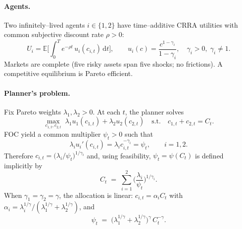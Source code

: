 \documentclass[11pt]{article}
\newcommand{\E}{\mathbb{E}}
\newcommand{\1}{\mathbbm{1}}
\newcommand{\dd}{\mathrm{d}}
\begin{document}
\paragraph{Agents.}
Two infinitely--lived agents \(i\in\{1,2\}\) have time--additive CRRA utilities with common subjective discount rate \(\rho>0\):
\begin{equation}
  U_i = \E\Big[ \int_0^T e^{-\rho t}\, u_i(c_{i,t})\,\dd t \Big], 
  \qquad 
  u_i(c)=\frac{c^{1-\gamma_i}}{1-\gamma_i}, 
  \quad \gamma_i>0,\;\gamma_i\neq1.
\end{equation}
Markets are complete (five risky assets span five shocks; no frictions). A competitive equilibrium is Pareto efficient.

\paragraph{Planner's problem.}
Fix Pareto weights \(\lambda_1,\lambda_2>0\). At each \(t\), the planner solves
\begin{equation}\label{eq:planner-static}
  \max_{c_{1,t},c_{2,t}} \; \lambda_1 u_1(c_{1,t}) + \lambda_2 u_2(c_{2,t})
  \quad\text{s.t.}\quad c_{1,t}+c_{2,t}=C_t.
\end{equation}
FOC yield a common multiplier \(\psi_t>0\) such that
\begin{equation}\label{eq:FOC}
  \lambda_i u_i'(c_{i,t}) = \lambda_i c_{i,t}^{-\gamma_i} = \psi_t,
  \qquad i=1,2.
\end{equation}
Therefore \(c_{i,t} = \big(\lambda_i/\psi_t\big)^{1/\gamma_i}\) and, using feasibility, \(\psi_t=\psi(C_t)\) is defined implicitly by
\begin{equation}\label{eq:psi-implicit}
  C_t \;=\; \sum_{i=1}^2 \Big(\frac{\lambda_i}{\psi_t}\Big)^{1/\gamma_i}.
\end{equation}
When \(\gamma_1=\gamma_2=\gamma\), the allocation is linear: \(c_{i,t} = \alpha_i C_t\) with \(\alpha_i=\lambda_i^{1/\gamma}/(\lambda_1^{1/\gamma}+\lambda_2^{1/\gamma})\), and
\begin{equation}\label{eq:psi-equal-gamma}
  \psi_t \;=\; \Big(\lambda_1^{1/\gamma}+\lambda_2^{1/\gamma}\Big)^{\gamma}\, C_t^{-\gamma}.
\end{equation}
\end{document}
